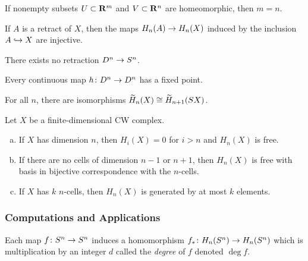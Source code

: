 \begin{theorem}
  If nonempty subsets $U \subset \mathbf{R}^m$ and $V \subset \mathbf{R}^n$ are homeomorphic, then $m = n$.
\end{theorem}

\begin{proposition}
  If $A$ is a retract of $X$, then the maps $H_n(A) \rightarrow H_n(X)$ induced by the inclusion $A \hookrightarrow X$ are injective.
\end{proposition}

\begin{corollary}
  There exists no retraction $D^n \rightarrow S^n$.
\end{corollary}

\begin{corollary}
    Every continuous map $h \colon D^n \rightarrow D^n$ has a fixed point.
\end{corollary}

\begin{proposition}
  For all $n$, there are isomorphisms $\widetilde{H}_n(X) \cong \widetilde{H}_{n+1}(S X)$.
\end{proposition}

\begin{proposition}
  Let $X$ be a finite-dimensional CW complex.
  \begin{enumerate}[(a)]
  \item If $X$ has dimension $n$, then $H_i(X) = 0$ for $i > n$ and $H_n(X)$ is free.
  \item If there are no cells of dimension $n-1$ or $n+1$, then $H_n(X)$ is free with basis in bijective correspondence with the $n$-cells.
  \item If $X$ has $k$ $n$-cells, then $H_n(X)$ is generated by at most $k$ elements.
  \end{enumerate}
\end{proposition}

\subsubsection{Computations and Applications}

\begin{definition}
  Each map $f \colon S^n \rightarrow S^n$ induces a homomorphism $f_\ast \colon H_n(S^n) \rightarrow H_n(S^n)$ which is multiplication by an integer $d$ called the \emph{degree} of $f$ denoted $\deg f$.
\end{definition}

